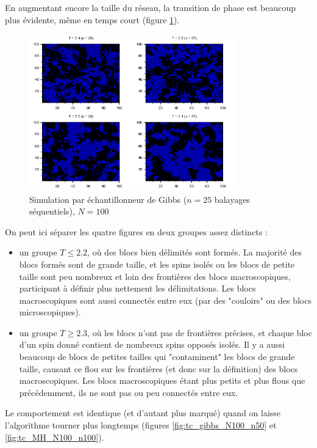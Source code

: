 \documentclass[a4paper,11pt]{article}
\begin{document}
En augmentant encore la taille du réseau, la transition de phase est beaucoup plus évidente, même en temps court (figure \ref{fig:tc_gibbs_N100_n25}).
\begin{figure}[!htbp]
	\centering
	\includegraphics[width=0.8\textwidth]{temperature_critique_gibbs_N100_n25.png}
	\caption{Simulation par échantillonneur de Gibbs ($n = 25$ balayages séquentiels), $N = 100$}
	\label{fig:tc_gibbs_N100_n25}
\end{figure}
On peut ici séparer les quatre figures en deux groupes assez distincts :
\begin{itemize}
	\item un groupe $T \leq 2.2$, où des blocs bien délimités sont formés. La majorité des blocs formés sont de grande taille, et les spins isolés ou les blocs de petite taille sont peu nombreux et loin des frontières des blocs macroscopiques, participant à définir plus nettement les délimitations. Les blocs macroscopiques sont aussi connectés entre eux (par des "couloirs" ou des blocs microscopiques).
	\item un groupe $T \geq 2.3$, où les blocs n'ont pas de frontières précises, et chaque bloc d'un spin donné contient de nombreux spins opposés isolés. Il y a aussi beaucoup de blocs de petites tailles qui "contaminent" les blocs de grande taille, causant ce flou sur les frontières (et donc sur la définition) des blocs macroscopiques. Les blocs macroscopiques étant plus petits et plus flous que précédemment, ils ne sont pas ou peu connectés entre eux.
\end{itemize}
Le comportement est identique (et d'autant plus marqué) quand on laisse l'algorithme tourner plus longtemps (figures \ref{fig:tc_gibbs_N100_n50} et \ref{fig:tc_MH_N100_n100}).
\end{document}

